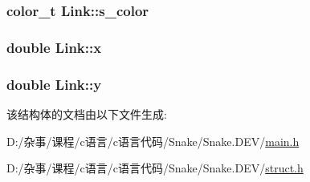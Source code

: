 \subsubsection[{s\+\_\+color}]{\setlength{\rightskip}{0pt plus 5cm}color\+\_\+t Link\+::s\+\_\+color}\label{struct_link_a017dab4fa599bc8ee71f11f078ff1b20}
\hypertarget{struct_link_a7d8ad6030eb88738aa2b76ba600fff20}{}
\subsubsection[{x}]{\setlength{\rightskip}{0pt plus 5cm}double Link\+::x}\label{struct_link_a7d8ad6030eb88738aa2b76ba600fff20}
\hypertarget{struct_link_a1763ac8834725fc439116fb9053e598e}{}
\subsubsection[{y}]{\setlength{\rightskip}{0pt plus 5cm}double Link\+::y}\label{struct_link_a1763ac8834725fc439116fb9053e598e}


该结构体的文档由以下文件生成\+:\begin{DoxyCompactItemize}
\item 
D\+:/杂事/课程/c语言/c语言代码/\+Snake/\+Snake.\+D\+E\+V/\hyperlink{main_8h}{main.\+h}\item 
D\+:/杂事/课程/c语言/c语言代码/\+Snake/\+Snake.\+D\+E\+V/\hyperlink{struct_8h}{struct.\+h}\end{DoxyCompactItemize}
